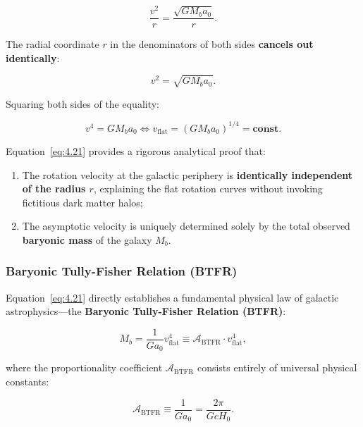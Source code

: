 \begin{equation}\label{eq:4.19}\tag{4.19}
\frac{v^2}{r} = \frac{\sqrt{G M_b a_0}}{r}.
\end{equation}

The radial coordinate $r$ in the denominators of both sides \textbf{cancels out identically}:

\begin{equation}\label{eq:4.20}\tag{4.20}
v^2 = \sqrt{G M_b a_0}.
\end{equation}

Squaring both sides of the equality:

\begin{equation}\label{eq:4.21}\tag{4.21}
v^4 = G M_b a_0 \iff v_{\text{flat}} = \left( G M_b a_0 \right)^{1/4} = \mathbf{\text{const}}.
\end{equation}

Equation~\eqref{eq:4.21} provides a rigorous analytical proof that:

\begin{enumerate}
\item The rotation velocity at the galactic periphery is \textbf{identically independent of the radius $r$}, explaining the flat rotation curves without invoking fictitious dark matter halos;
\item The asymptotic velocity is uniquely determined solely by the total observed \textbf{baryonic mass} of the galaxy $M_b$.
\end{enumerate}


\subsubsection{Baryonic Tully-Fisher Relation (BTFR)}\label{sec:4.2.3}

Equation~\eqref{eq:4.21} directly establishes a fundamental physical law of galactic astrophysics---the \textbf{Baryonic Tully-Fisher Relation (BTFR)}:

\begin{equation}\label{eq:4.22}\tag{4.22}
M_b = \frac{1}{G a_0} v_{\text{flat}}^4 \equiv \mathcal{A}_{\text{BTFR}} \cdot v_{\text{flat}}^4,
\end{equation}

where the proportionality coefficient $\mathcal{A}_{\text{BTFR}}$ consists entirely of universal physical constants:

\begin{equation}\label{eq:4.23}\tag{4.23}
\mathcal{A}_{\text{BTFR}} \equiv \frac{1}{G a_0} = \frac{2\pi}{G c H_0}.
\end{equation}


